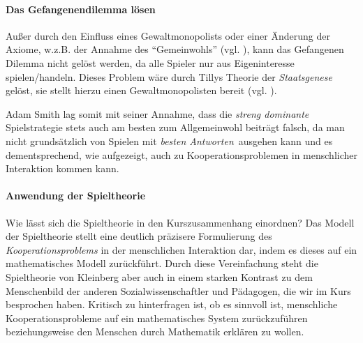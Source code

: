 \paragraph{Das Gefangenendilemma lösen}

Außer durch den Einfluss eines Gewaltmonopolists oder einer Änderung der Axiome, w.z.B. der Annahme des ``Gemeinwohls'' (vgl. \citeauthor{rousseau-1762}), kann das Gefangenen Dilemma nicht gelöst werden, da alle Spieler nur aus Eigeninteresse spielen/handeln.
Dieses Problem wäre durch Tillys Theorie der \emph{Staatsgenese} gelöst, sie stellt hierzu einen Gewaltmonopolisten bereit (vgl. \citeauthor{Tilly-1985-aa}).

Adam Smith lag somit mit seiner Annahme, dass die \emph{streng dominante} Spielstrategie stets auch am besten zum Allgemeinwohl beiträgt falsch, da man nicht grundsätzlich von Spielen mit \emph{besten Antworten} ausgehen kann und es dementsprechend, wie aufgezeigt, auch zu Kooperationsproblemen in menschlicher Interaktion kommen kann.

\paragraph{Anwendung der Spieltheorie}

Wie lässt sich die Spieltheorie in den Kurszusammenhang einordnen?
Das Modell der Spieltheorie stellt eine deutlich präzisere Formulierung des \emph{Kooperationsproblems} in der menschlichen Interaktion dar, indem es dieses auf ein mathematisches Modell zurückführt.
Durch diese Vereinfachung steht die Spieltheorie von Kleinberg aber auch in einem starken Kontrast zu dem Menschenbild der anderen Sozialwissenschaftler und Pädagogen, die wir im Kurs besprochen haben.
Kritisch zu hinterfragen ist, ob es sinnvoll ist, menschliche Kooperationsprobleme auf ein mathematisches System zurückzuführen beziehungsweise den Menschen durch Mathematik erklären zu wollen.

